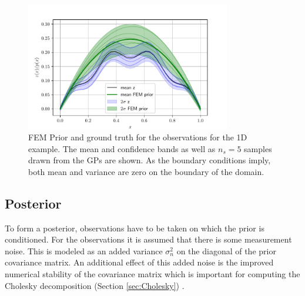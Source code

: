 \documentclass[%
  a4paper,oneside,%
  11pt,%
  smallchapters,
  style=printdev,
  extramargin,
  green,%
  rgb, <cmyk>
  ]{tubsbook}
\begin{document}
\begin{figure}[H]
\includegraphics[width=0.8\textwidth]{pics/FEMprior_Z.pdf}
\centering
\caption[FEM prior and ground truth GPs for the 1D example]{FEM Prior and ground truth for the observations for the 1D example. The mean and confidence bands as well as $n_s = 5$ samples drawn from the GPs are shown. As the boundary conditions imply, both mean and variance are zero on the boundary of the domain.}
\label{fig:FEMGP1D}
\end{figure}






\subsection{Posterior}
To form a posterior, observations have to be taken on which the prior is conditioned.
For the observations it is assumed that there is some measurement noise. This is modeled as an added variance $\sigma_{n}^2$ on the diagonal of the prior covariance matrix. An additional effect of this added noise is the improved numerical stability of the covariance matrix which is important for computing the Cholesky decomposition (Section \ref{sec:Cholesky}) \cite[p.14]{girolami2021}.
\end{document}
